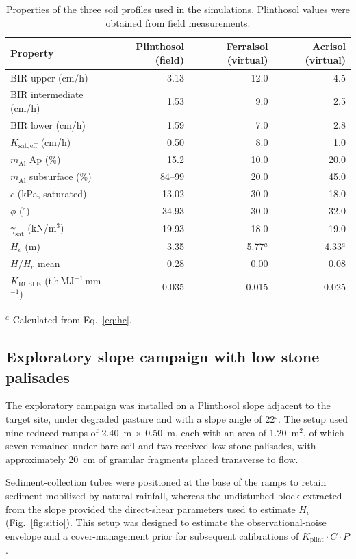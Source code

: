 \documentclass[preprint,review,12pt,authoryear]{elsarticle}
\begin{document}
\begin{table}[htbp]
\centering
\caption{Properties of the three soil profiles used in the simulations. Plinthosol values were obtained from field measurements.}
\label{tab:profiles}
\small
\begin{tabular}{@{}l r r r@{}}
\toprule
Property & Plinthosol (field) & Ferralsol (virtual) & Acrisol (virtual) \\
\midrule
BIR upper (cm/h) & 3.13 & 12.0 & 4.5 \\
BIR intermediate (cm/h) & 1.53 & 9.0 & 2.5 \\
BIR lower (cm/h) & 1.59 & 7.0 & 2.8 \\
$K_{\mathrm{sat,eff}}$ (cm/h) & 0.50 & 8.0 & 1.0 \\
$m_{\mathrm{Al}}$ Ap (\%) & 15.2 & 10.0 & 20.0 \\
$m_{\mathrm{Al}}$ subsurface (\%) & 84--99 & 20.0 & 45.0 \\
$c$ (kPa, saturated) & 13.02 & 30.0 & 18.0 \\
$\phi$ ($^\circ$) & 34.93 & 30.0 & 32.0 \\
$\gamma_{\mathrm{sat}}$ (kN/m$^3$) & 19.93 & 18.0 & 19.0 \\
$H_c$ (m) & 3.35 & 5.77$^a$ & 4.33$^a$ \\
$H/H_c$ mean & 0.28 & 0.00 & 0.08 \\
$K_{\mathrm{RUSLE}}$ (t\,h\,MJ$^{-1}$\,mm$^{-1}$) & 0.035 & 0.015 & 0.025 \\
\bottomrule
\end{tabular}

\noindent $^a$ Calculated from Eq.~\ref{eq:hc}.
\end{table}

\subsection{Exploratory slope campaign with low stone palisades}
\label{sec:field-palisades}

The exploratory campaign was installed on a Plinthosol slope adjacent to the target site, under degraded pasture and with a slope angle of 22$^\circ$. The setup used nine reduced ramps of 2.40~m $\times$ 0.50~m, each with an area of 1.20~m$^2$, of which seven remained under bare soil and two received low stone palisades, with approximately 20~cm of granular fragments placed transverse to flow.

Sediment-collection tubes were positioned at the base of the ramps to retain sediment mobilized by natural rainfall, whereas the undisturbed block extracted from the slope provided the direct-shear parameters used to estimate $H_c$ (Fig.~\ref{fig:sitio}). This setup was designed to estimate the observational-noise envelope and a cover-management prior for subsequent calibrations of $K_{\mathrm{plint}} \cdot C \cdot P$.
\end{document}
